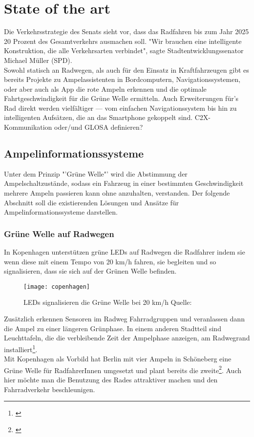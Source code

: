 \chapter{State of the art}
Die Verkehrsstrategie des Senats sieht vor, dass das Radfahren bis zum Jahr 2025 20 Prozent des Gesamtverkehrs ausmachen soll. \cite{Mopo}
"Wir brauchen eine intelligente Konstruktion, die alle Verkehrsarten verbindet", sagte Stadtentwicklungssenator Michael Müller (SPD).\\
Sowohl statisch an Radwegen, als auch für den Einsatz in Kraftfahrzeugen gibt es bereits Projekte zu Ampelassistenten in Bordcomputern, Navigationssystemen, oder aber auch als App die rote Ampeln erkennen und die optimale Fahrtgeschwindigkeit für die Grüne Welle ermitteln. Auch Erweiterungen für's Rad direkt werden vielfältiger --- vom einfachen Navigationssystem bis hin zu intelligenten Aufsätzen, die an das Smartphone gekoppelt sind.
\gls{C2X}- Kommunikation oder/und \gls{GLOSA} definieren?
\section{Ampelinformationssysteme}
Unter dem Prinzip "'Grüne Welle"' wird die Abstimmung der Ampelschaltzustände, sodass ein Fahrzeug in einer bestimmten Geschwindigkeit mehrere Ampeln passieren kann ohne anzuhalten, verstanden. Der folgende Abschnitt soll die existierenden Lösungen und Ansätze für Ampelinformationssysteme darstellen.
\subsection{Grüne Welle auf Radwegen}
In Kopenhagen unterstützen grüne \gls{LED}s auf Radwegen die Radfahrer indem sie wenn diese mit einem Tempo von 20 km/h fahren, sie begleiten und so signalisieren, dass sie sich auf der Grünen Welle befinden. 
\begin{figure}[H]  
    \centering  
    \texttt{[image: copenhagen]} \label{fig:copenhagen}
    \caption[Grüne Welle durch \gls{LED}s]{\gls{LED}s signalisieren die Grüne Welle bei 20 km/h  Quelle: \cite{NYT}}
\end{figure}
Zusätzlich erkennen Sensoren im Radweg Fahrradgruppen und veranlassen dann die Ampel zu einer längeren Grünphase. In einem anderen Stadtteil sind Leuchttafeln, die die verbleibende Zeit der Ampelphase anzeigen, am Radwegrand installiert\footnote{\cite{KopIng}}.\\
Mit Kopenhagen als Vorbild hat Berlin mit vier Ampeln in Schöneberg eine Grüne Welle für RadfahrerInnen umgesetzt und plant bereits die zweite\footnote{\cite{BZ}}. Auch hier möchte man die Benutzung des Rades attraktiver machen und den Fahrradverkehr beschleunigen.
